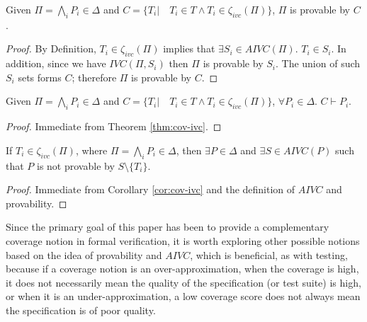\begin{theorem}
\label{thm:cov-ivc}
Given $\Pi = \bigwedge_{i} {P_i \in \Delta}$ and
$C = \{T_i |\quad T_i \in T \wedge T_i \in \zeta_{ivc}(\Pi) \}$,
$\Pi$ is provable by $C$.
\end{theorem}
\begin{proof}
By Definition, $T_i \in \zeta_{ivc}(\Pi)$ implies that $\exists S_i \in AIVC(\Pi)$. $T_i \in S_i$.
In addition, since we have $IVC(\Pi, S_i)$ then $\Pi$ is provable by $S_i$. The union of such $S_i$ sets
forms $C$;
therefore $\Pi$ is provable by $C$.
\end{proof}
\vspace{2mm}

\begin{coroll}
\label{cor:cov-ivc}
Given $\Pi = \bigwedge_{i} {P_i \in \Delta}$ and
$C = \{T_i |\quad T_i \in T \wedge T_i \in \zeta_{ivc}(\Pi)\}$,
$\forall P_i \in \Delta$. $C \vdash P_i$.
\end{coroll}
\begin{proof}
Immediate from Theorem \ref{thm:cov-ivc}.
\end{proof}
\vspace{2mm}

\begin{theorem}
\label{thm:ivc-r}
If $T_i \in \zeta_{ivc}(\Pi)$, where $\Pi = \bigwedge_{i} {P_i \in \Delta}$,   then $\exists P \in \Delta$ and $\exists S \in AIVC(P)$ such that $P$ is not provable by $S \setminus \{T_i \}$.
\end{theorem}
\begin{proof}
Immediate from Corollary \ref{cor:cov-ivc} and the definition of $AIVC$ and provability.
\end{proof}
\vspace{2mm}


Since the primary goal of
 this paper has been to provide a complementary coverage notion in
  formal verification, it is worth exploring other possible notions based on the idea of provability and $AIVC$, which is beneficial, as with testing, because if a coverage notion is an over-approximation, when the coverage
 is high, it does not necessarily mean the quality of
 the specification (or test suite) is high, or when it is an under-approximation, a low coverage score does not always mean the specification is of poor quality.

